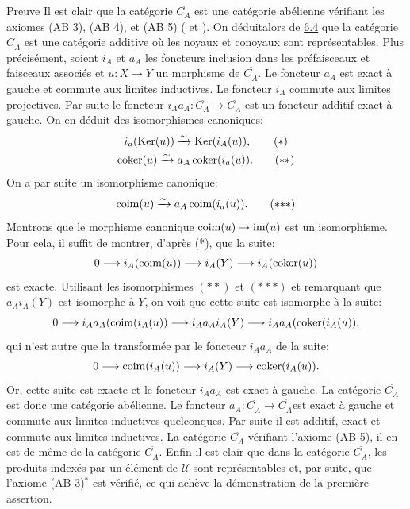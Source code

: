 \documentclass[10pt]{../fichiers-configuration-latex/smfart}
\begin{document}
\begin{enonce*}[remark]{Preuve}
Il est clair que la catégorie $C^{\widehat{\phantom{,}}}_A$ est une
catégorie abélienne vérifiant les axiomes (AB 3), (AB 4), et (AB 5)
( et ). On déduit\pageoriginale alors
de \hyperref[II.prop6.4]{6.4} que la catégorie $C^{\widetilde{\phantom{,}}}_A$
est une catégorie additive où les noyaux et conoyaux sont
représentables. Plus précisément, soient $i_A$ et $a_A$ les
foncteurs inclusion dans les préfaisceaux et faisceaux associés et
$u:X\rightarrow Y$ un morphisme de $C^{\widetilde{\phantom{,}}}_A$.
Le foncteur $a_A$ est exact à gauche et commute aux limites
inductives. Le foncteur $i_A$ commute aux limites projectives. Par
suite le foncteur $i_A a_A:C^{\widehat{\phantom{,}}}_A\rightarrow
C^{\widehat{\phantom{,}}}_A$ est un foncteur additif exact à gauche.
On en déduit des isomorphismes canoniques:
\begin{gather*}
i_a(\Ker(u))\xrightarrow{\sim} \Ker(i_A(u)){\quoi},\tag{$\ast$}\\
\coker(u)\xrightarrow{\sim} a_A \coker
(i_a(u)){\quoi}.\tag{${\ast}{\ast}$}
\end{gather*}
On a par suite un isomorphisme canonique:
\begin{equation}\coim(u)\xrightarrow{\sim} a_A \coim (i_a (u)){\quoi}.
\tag{${\ast}{\ast}{\ast}$}
\end{equation}
Montrons que le morphisme canonique $\operatorname{coim}(u)\rightarrow \operatorname{im}(u)$ est
un isomorphisme. Pour cela, il suffit de montrer, d'après (*), que
la suite:
$$
0\longrightarrow i_A(\operatorname{coim}(u))\longrightarrow i_A(Y)\longrightarrow
i_A(\operatorname{coker}(u))
$$
est exacte. Utilisant les isomorphismes $({\ast}{\ast})$ et
$({\ast}{\ast}{\ast})$ et remarquant que $a_A i_A(Y)$ est isomorphe
à $Y$, on voit que cette suite est isomorphe à la suite:
$$
0\longrightarrow i_A a_A(\operatorname{coim}(i_A(u))\longrightarrow i_A a_A i_A
(Y)\longrightarrow i_A a_A (\operatorname{coker}(i_A (u)){},
$$
qui n'est autre que la transformée par le foncteur $i_Aa_A$ de la
suite:
$$
0\longrightarrow \operatorname{coim}(i_A (u))\longrightarrow i_A(Y)\longrightarrow
\operatorname{coker} (i_A(u)){}.
$$
Or, cette suite est exacte et le foncteur $i_Aa_A$ est exact à
gauche. La catégorie $C^{\widetilde{\phantom{,}}}_A$ est donc une
catégorie abélienne. Le foncteur
$a_A:C^{\widehat{\phantom{,}}}_A\rightarrow
C^{\widetilde{\phantom{,}}}_A$\pageoriginale est exact à gauche et
commute aux limites inductives quelconques. Par suite il est
additif, exact et commute aux limites inductives. La catégorie
$C^{\widehat{\phantom{,}}}_A$ vérifiant l'axiome (AB 5), il en est
de même de la catégorie $C^{\widetilde{\phantom{,}}}_A$. Enfin
il est clair que dans la catégorie
$C^{\widetilde{\phantom{,}}}_A$, les produits indexés par un
élément de $𝒰$ sont représentables et, par suite, que
l'axiome (AB 3)$^{\ast}$ est vérifié, ce qui achève la
démonstration de la première assertion.
\end{enonce*}
\end{document}
